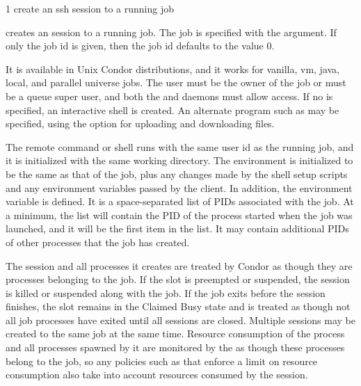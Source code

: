 \begin{ManPage}
{\label{man-condor-ssh-to-job}}{1}
{create an ssh session to a running job}
\Synopsis {}

\ToolDebugOption
{}


\Description

 creates an  session to a running job.
The job is specified with the argument.
If only the job  id is given,
then the job  id defaults to the value 0.

It is available in Unix Condor distributions, 
and it works for vanilla, vm, java, local, and parallel universe jobs.
The user must be the owner of the job or must be a queue super user, 
and both the  and  daemons
must allow  access.
If no  is specified, an interactive shell is created.
An alternate  program such as  may be specified,
using the  option for uploading and downloading files.

The remote command or shell runs with the same user id as the running job,
and it is initialized with the same working directory.
The environment is initialized to be the same as that of the job,
plus any changes made by the shell setup scripts
and any environment variables passed by the  client.
In addition, the environment variable
 is defined.  
It is a space-separated list of PIDs associated with the job.
At a minimum, the list will contain the
PID of the process started when the job was launched,
and it will be the first item in the list.
It may contain additional PIDs of other processes that the job has created.

The  session and all processes it creates are treated by Condor as
though they are processes belonging to the job.
If the slot is preempted or suspended,
the  session is killed or suspended along with the job.
If the job exits before the  session finishes,
the slot remains in the Claimed Busy state and is treated as though not
all job processes have exited until all  sessions are closed.
Multiple  sessions may be created to the same job at the
same time.  Resource consumption of the  process and all processes
spawned by it are monitored by the  as though these
processes belong to the job, so any policies such as  that
enforce a limit on resource consumption also take into account resources
consumed by the  session.


\end{ManPage}
